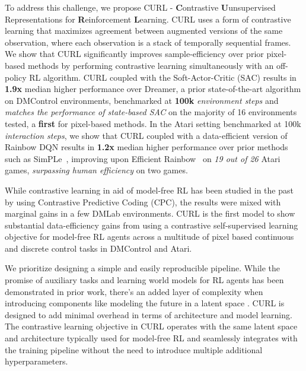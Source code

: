 \documentclass{article}
\begin{document}
To address this challenge, we propose CURL - \textbf{C}ontrastive \textbf{U}unsupervised Representations for \textbf{R}einforcement \textbf{L}earning. CURL uses a form of contrastive learning that maximizes agreement between augmented versions of the same observation, where each observation is a stack of temporally sequential frames. We show that CURL significantly improves sample-efficiency over prior pixel-based methods by performing contrastive learning simultaneously with an off-policy RL algorithm. CURL coupled with the Soft-Actor-Critic (SAC) \cite{haarnoja2018soft} results in {\textbf{1.9x}} median higher performance over Dreamer, a prior state-of-the-art algorithm on DMControl environments, benchmarked at {\textbf{100k}} {\it environment steps} and {\it matches the performance of state-based SAC} on the majority of 16 environments tested, a {\textbf{first}} for pixel-based methods. In the Atari setting benchmarked at 100k {\it interaction steps}, we show that CURL coupled with a data-efficient version of Rainbow DQN \cite{van2019use} results in {\textbf{1.2x}} median higher performance over prior methods such as SimPLe~\cite{kaiser2019model}, improving upon Efficient Rainbow~\cite{van2019use} on {\it 19 out of 26} Atari games, {\it surpassing human efficiency} on two games. 

While contrastive learning in aid of model-free RL has been studied in the past by \citet{oord2018representation} using Contrastive Predictive Coding (CPC), the results were mixed with marginal gains in a few DMLab \cite{espeholt2018impala} environments. CURL is the first model to show substantial data-efficiency gains from using a contrastive self-supervised learning objective for model-free RL agents across a multitude of pixel based continuous and discrete control tasks in DMControl and Atari.


We prioritize designing a simple and easily reproducible pipeline. While the promise of auxiliary tasks and learning world models for RL agents has been demonstrated in prior work, there's an added layer of complexity when introducing components like modeling the future in a latent space \cite{oord2018representation, ha2018world}. CURL is designed to add minimal overhead in terms of architecture and model learning. The contrastive learning objective in CURL operates with the same latent space and architecture typically used for model-free RL and seamlessly integrates with the training pipeline without the need to introduce multiple additional hyperparameters. 
\end{document}
